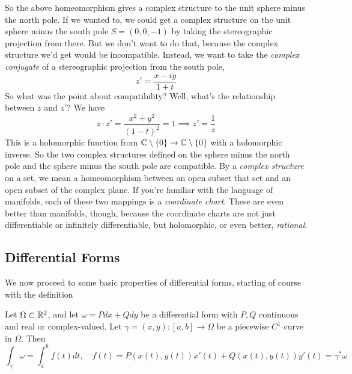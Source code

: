 \documentclass{article}
\begin{document}
So the above homeomorphism gives a complex structure to the unit sphere minus the north pole. If we wanted to, we could get a complex structure on the unit sphere minus the south pole \(S = (0, 0, -1)\) by taking the stereographic projection from there. But we don't want to do that, because the complex structure we'd get would be incompatible. Instead, we want to take the \textit{complex conjugate} of a stereographic projection from the south pole,
\begin{equation}z' = \frac{x - iy}{1 + t}\end{equation}
So what was the point about compatibility? Well, what's the relationship between \(z\) and \(z'\)? We have
\begin{equation}z \cdot z' = \frac{x^2 + y^2}{(1 - t)^2} = 1 \implies z' = \frac{1}{z}\end{equation}
This is a holomorphic function from \(\mathbb{C} \setminus \{0\} \to \mathbb{C} \setminus \{0\}\) with a holomorphic inverse. So the two complex structures defined on the sphere minus the north pole and the sphere minus the south pole are compatible. By a \textit{complex structure} on a set, we mean a homeomorphism between an open subset that set and an open subset of the complex plane. If you're familiar with the language of manifolds, each of these two mappings is a \textit{coordinate chart}. These are even better than manifolds, though, because the coordinate charts are not just differentiable or infinitely differentiable, but holomorphic, or even better, \textit{rational}.

\subsection{Differential Forms}

We now proceed to some basic properties of differential forms, starting of course with the definition
\begin{definition}
\end{definition}

\begin{theorem}
Let \(\Omega \subset \mathbb{R}^2\), and let \(\omega = Pdx + Qdy\) be a differential form with \(P, Q\) continuous and real or complex-valued. Let \(\gamma = (x, y): [a, b] \to \Omega\) be a piecewise \(C^1\) curve in \(\Omega\). Then
\begin{equation}
  \int_\gamma\omega = \int_a^bf(t)dt,
  \quad f(t) = P(x(t), y(t))x'(t) + Q(x(t), y(t))y'(t) = \gamma^*\omega
\end{equation}
\end{theorem}
\end{document}
